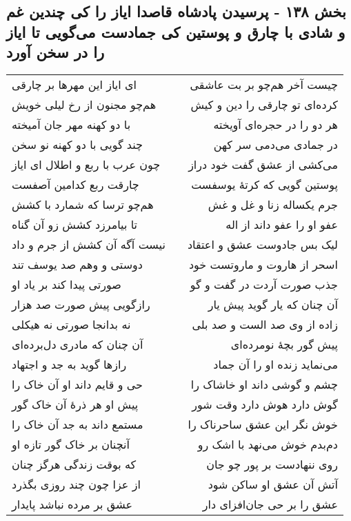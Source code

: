 \begin{center}
\section*{بخش ۱۳۸ - پرسیدن پادشاه قاصدا ایاز را کی چندین غم و شادی با چارق و پوستین کی جمادست می‌گویی تا ایاز را در سخن آورد}
\label{sec:sh138}
\begin{longtable}{l p{0.5cm} r}
ای ایاز این مهرها بر چارقی
&&
چیست آخر هم‌چو بر بت عاشقی
\\
هم‌چو مجنون از رخ لیلی خویش
&&
کرده‌ای تو چارقی را دین و کیش
\\
با دو کهنه مهر جان آمیخته
&&
هر دو را در حجره‌ای آویخته
\\
چند گویی با دو کهنه نو سخن
&&
در جمادی می‌دمی سر کهن
\\
چون عرب با ربع و اطلال ای ایاز
&&
می‌کشی از عشق گفت خود دراز
\\
چارقت ربع کدامین آصفست
&&
پوستین گویی که کرتهٔ یوسفست
\\
هم‌چو ترسا که شمارد با کشش
&&
جرم یکساله زنا و غل و غش
\\
تا بیامرزد کشش زو آن گناه
&&
عفو او را عفو داند از اله
\\
نیست آگه آن کشش از جرم و داد
&&
لیک بس جادوست عشق و اعتقاد
\\
دوستی و وهم صد یوسف تند
&&
اسحر از هاروت و ماروتست خود
\\
صورتی پیدا کند بر یاد او
&&
جذب صورت آردت در گفت و گو
\\
رازگویی پیش صورت صد هزار
&&
آن چنان که یار گوید پیش یار
\\
نه بدانجا صورتی نه هیکلی
&&
زاده از وی صد الست و صد بلی
\\
آن چنان که مادری دل‌برده‌ای
&&
پیش گور بچهٔ نومرده‌ای
\\
رازها گوید به جد و اجتهاد
&&
می‌نماید زنده او را آن جماد
\\
حی و قایم داند او آن خاک را
&&
چشم و گوشی داند او خاشاک را
\\
پیش او هر ذرهٔ آن خاک گور
&&
گوش دارد هوش دارد وقت شور
\\
مستمع داند به جد آن خاک را
&&
خوش نگر این عشق ساحرناک را
\\
آنچنان بر خاک گور تازه او
&&
دم‌بدم خوش می‌نهد با اشک رو
\\
که بوقت زندگی هرگز چنان
&&
روی ننهادست بر پور چو جان
\\
از عزا چون چند روزی بگذرد
&&
آتش آن عشق او ساکن شود
\\
عشق بر مرده نباشد پایدار
&&
عشق را بر حی جان‌افزای دار

\end{longtable}
\end{center}

